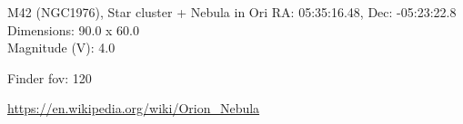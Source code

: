 \begin{block}{M42 (NGC1976), Star cluster + Nebula in Ori}
    RA: 05:35:16.48, Dec: -05:23:22.8 \\ 
    Dimensions: 90.0 x 60.0 \\ 
    Magnitude (V): 4.0



    Finder fov: 120 

    \url{https://en.wikipedia.org/wiki/Orion_Nebula} 
\end{block}